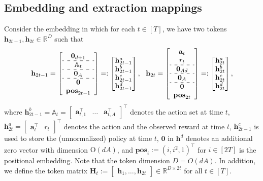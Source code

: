 \documentclass[10pt]{article}
\newcommand{\<}{\left\langle}
\renewcommand{\>}{\right\rangle}
\newcommand{\bzero}{{\mathbf 0}}
\newcommand{\R}{\mathbb{R}}
\newcommand{\posv}{{\mathbf{pos}}}
\newcommand{\parta}{{a}}
\newcommand{\partb}{{b}}
\newcommand{\partc}{{c}}
\newcommand{\partd}{{d}}
\newcommand{\totlen}{{T}}
\newcommand{\conO}{{\mathrm{O}}}
\def\sA{{\mathbb{A}}}
\def\bH{{\mathbf H}}
\def\ba{{\mathbf a}}
\def\bh{{\mathbf h}}
\begin{document}
\subsection{Embedding and extraction mappings}\label{sec:tf_embed_bandit}
Consider the embedding in which for each $t\in[\totlen]$, we have two tokens $\bh_{2t-1},\bh_{2t}\in\R^D$ such that
\[
\begin{aligned}
\bh_{2t-1}=
\left[
\begin{array}{c}
     \bzero_{d+1} \\
     \hdashline
     \sA_t\\
     \hdashline
     \bzero_A\\
     \hdashline
      \bzero\\ \posv_{2t-1}
\end{array}
\right]
=:
\begin{bmatrix}
     \bh_{2t-1}^{\parta} \\  \bh_{2t-1}^{\partb}\\  \bh_{2t-1}^{\partc}\\   \bh_{2t-1}^{\partd}\\
\end{bmatrix},~~
\bh_{2t}=
\left[
\begin{array}{cc}
     \ba_{t} \\
      r_t\\
      \hdashline
       \bzero_{Ad}\\
       \hdashline
       \bzero_{A}\\
       \hdashline
       \bzero\\ \posv_{2t}
\end{array}
\right]=:
\begin{bmatrix}
    \bh_{2t}^{\parta} \\  \bh_{2t}^{\partb}\\   \bh_{2t}^{\partc}\\   \bh_{2t}^{\partd}
\end{bmatrix},
\end{aligned}
\]
where $\bh_{2t-1}^{\partb}=\sA_t=\begin{bmatrix}
    \ba_{t,1}^\top &\ldots & \ba_{t,A}^\top
\end{bmatrix}^\top$ denotes the action set at time $t$, $\bh_{2t}^{\parta}=\begin{bmatrix}
    \ba_t^\top &r_t
\end{bmatrix}^\top$ denotes the action and the observed reward at time $t$, $\bh^\partc_{2t-1}$ is used to store the (unnormalized) policy at time  $t$, $\bzero$ in $\bh^\partd$ denotes an additional zero vector with  dimension $\conO(dA)$, and $\posv_i:=(i,i^2,1)^\top$ for $i\in[2\totlen]$ is the positional embedding.    Note that the token dimension $D= O(dA)$. In addition, we define the token matrix $\bH_t:=\begin{bmatrix}
    \bh_1,\ldots,\bh_{2t}
\end{bmatrix}\in\R^{D\times 2t}$ for all $t\in[\totlen]$.
\end{document}
